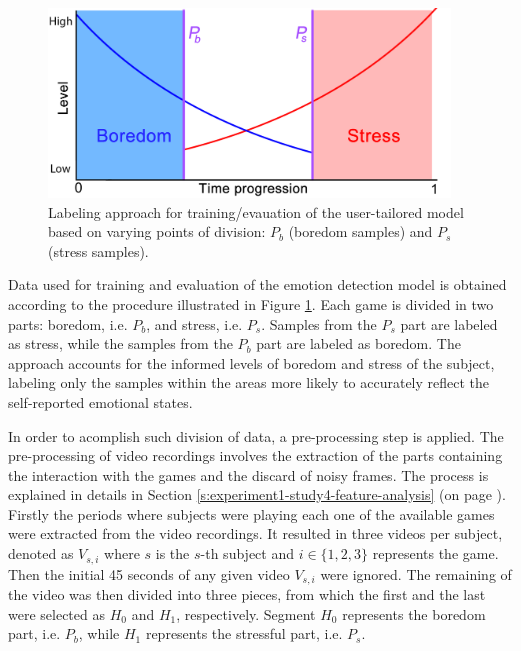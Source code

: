 \begin{figure}[ht]
    \centering
    \includegraphics[width=0.95\textwidth]{figures/machine-learning-labeling-approach-B.png}
    \caption{Labeling approach for training/evauation of the user-tailored model based on varying points of division: $P_b$ (boredom samples) and $P_s$ (stress samples).}
    \label{fig:machine-learning-labeling-approach-B}
\end{figure}

Data used for training and evaluation of the emotion detection model is obtained according to the procedure illustrated in Figure \ref{fig:machine-learning-labeling-approach-B}. Each game is divided in two parts: boredom, i.e. $P_b$, and stress, i.e. $P_s$. Samples from the $P_s$ part are labeled as stress, while the samples from the $P_b$ part are labeled as boredom. The approach accounts for the informed levels of boredom and stress of the subject, labeling only the samples within the areas more likely to accurately reflect the self-reported emotional states.

In order to acomplish such division of data, a pre-processing step is applied. The pre-processing of video recordings involves the extraction of the parts containing the interaction with the games and the discard of noisy frames. The process is explained in details in Section \ref{s:experiment1-study4-feature-analysis} (on page \pageref{s:experiment1-study4-feature-analysis}). Firstly the periods where subjects were playing each one of the available games were extracted from the video recordings. It resulted in three videos per subject, denoted as $V_{s,i}$ where $s$ is the $s$-th subject and $i \in \{1, 2, 3\}$ represents the game. Then the initial 45 seconds of any given video $V_{s,i}$ were ignored. The remaining of the video was then divided into three pieces, from which the first and the last were selected as $H_0$ and $H_1$, respectively. Segment $H_0$ represents the boredom part, i.e. $P_b$, while $H_1$ represents the stressful part, i.e. $P_s$.

